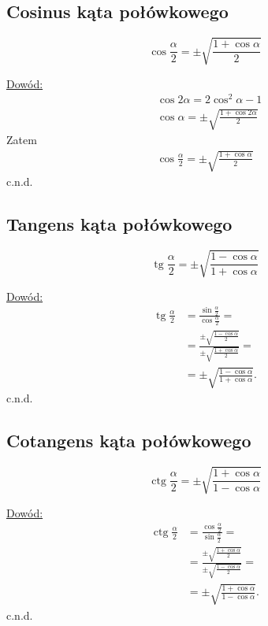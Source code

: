\documentclass[12pt,a4paper,fleqn]{article}
\DeclareMathOperator{\tg}{tg}
\DeclareMathOperator{\ctg}{ctg}
\begin{document}
		\subsection{Cosinus kąta połówkowego}
		\begin{equation*}
			\cos\frac{\alpha}{2} = \pm \sqrt{\frac{1+\cos\alpha}{2}}
		\end{equation*}
		
		\underline{Dowód:} \noindent
		\begin{align*}
			&\cos 2\alpha = 2\cos^2\alpha - 1\\
			&\cos\alpha = \pm \sqrt{\frac{1+\cos2\alpha}{2}}
		\end{align*}
		Zatem
		\begin{align*}
			\cos\frac{\alpha}{2} = \pm \sqrt{\frac{1+\cos\alpha}{2}}
		\end{align*}
		c.n.d.
		
		\subsection{Tangens kąta połówkowego}
		\begin{equation*}
			\tg\frac{\alpha}{2} = \pm \sqrt{\frac{1-\cos\alpha}{1+\cos\alpha}}
		\end{equation*}
		
		\underline{Dowód:} \noindent
		\begin{align*}
			\tg\frac{\alpha}{2} &= \frac{\sin\frac{\alpha}{2}}{\cos\frac{\alpha}{2}} =\\
								&= \frac{\pm \sqrt{\frac{1-\cos\alpha}{2}}}{\pm \sqrt{\frac{1+\cos\alpha}{2}}} =\\
								&= \pm \sqrt{\frac{1-\cos\alpha}{1+\cos\alpha}}.
		\end{align*}
		c.n.d.

		\subsection{Cotangens kąta połówkowego}
		\begin{equation*}
			\ctg\frac{\alpha}{2} = \pm \sqrt{\frac{1+\cos\alpha}{1-\cos\alpha}}
		\end{equation*}
		
		\underline{Dowód:} \noindent
		\begin{align*}
			\ctg\frac{\alpha}{2} &= \frac{\cos\frac{\alpha}{2}}{\sin\frac{\alpha}{2}} =\\
								 &= \frac{\pm \sqrt{\frac{1+\cos\alpha}{2}}}{\pm \sqrt{\frac{1-\cos\alpha}{2}}} =\\
								 &= \pm \sqrt{\frac{1+\cos\alpha}{1-\cos\alpha}}.
		\end{align*}
		c.n.d.
		
\end{document}
